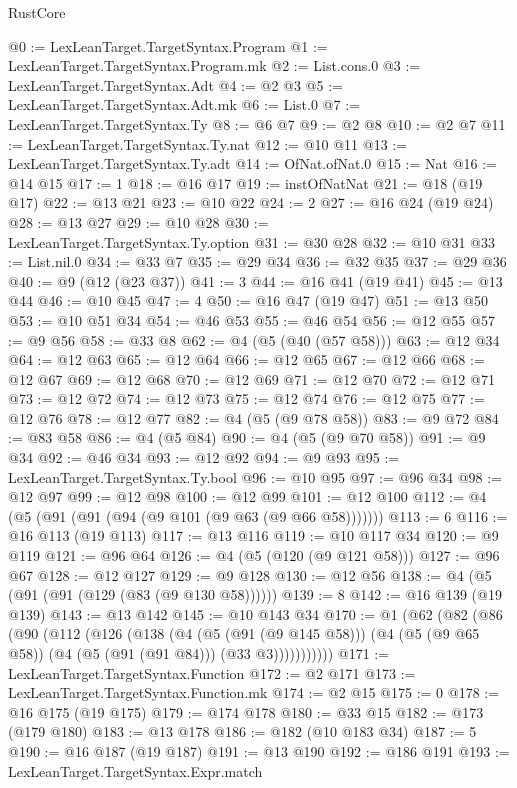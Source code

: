 \begin{lexlean}{RustCore}
\begin{coremodule}
@0 := LexLeanTarget.TargetSyntax.Program
@1 := LexLeanTarget.TargetSyntax.Program.mk
@2 := List.cons.{0}
@3 := LexLeanTarget.TargetSyntax.Adt
@4 := @2 @3
@5 := LexLeanTarget.TargetSyntax.Adt.mk
@6 := List.{0}
@7 := LexLeanTarget.TargetSyntax.Ty
@8 := @6 @7
@9 := @2 @8
@10 := @2 @7
@11 := LexLeanTarget.TargetSyntax.Ty.nat
@12 := @10 @11
@13 := LexLeanTarget.TargetSyntax.Ty.adt
@14 := OfNat.ofNat.{0}
@15 := Nat
@16 := @14 @15
@17 := 1
@18 := @16 @17
@19 := instOfNatNat
@21 := @18 (@19 @17)
@22 := @13 @21
@23 := @10 @22
@24 := 2
@27 := @16 @24 (@19 @24)
@28 := @13 @27
@29 := @10 @28
@30 := LexLeanTarget.TargetSyntax.Ty.option
@31 := @30 @28
@32 := @10 @31
@33 := List.nil.{0}
@34 := @33 @7
@35 := @29 @34
@36 := @32 @35
@37 := @29 @36
@40 := @9 (@12 (@23 @37))
@41 := 3
@44 := @16 @41 (@19 @41)
@45 := @13 @44
@46 := @10 @45
@47 := 4
@50 := @16 @47 (@19 @47)
@51 := @13 @50
@53 := @10 @51 @34
@54 := @46 @53
@55 := @46 @54
@56 := @12 @55
@57 := @9 @56
@58 := @33 @8
@62 := @4 (@5 (@40 (@57 @58)))
@63 := @12 @34
@64 := @12 @63
@65 := @12 @64
@66 := @12 @65
@67 := @12 @66
@68 := @12 @67
@69 := @12 @68
@70 := @12 @69
@71 := @12 @70
@72 := @12 @71
@73 := @12 @72
@74 := @12 @73
@75 := @12 @74
@76 := @12 @75
@77 := @12 @76
@78 := @12 @77
@82 := @4 (@5 (@9 @78 @58))
@83 := @9 @72
@84 := @83 @58
@86 := @4 (@5 @84)
@90 := @4 (@5 (@9 @70 @58))
@91 := @9 @34
@92 := @46 @34
@93 := @12 @92
@94 := @9 @93
@95 := LexLeanTarget.TargetSyntax.Ty.bool
@96 := @10 @95
@97 := @96 @34
@98 := @12 @97
@99 := @12 @98
@100 := @12 @99
@101 := @12 @100
@112 := @4 (@5 (@91 (@91 (@94 (@9 @101 (@9 @63 (@9 @66 @58)))))))
@113 := 6
@116 := @16 @113 (@19 @113)
@117 := @13 @116
@119 := @10 @117 @34
@120 := @9 @119
@121 := @96 @64
@126 := @4 (@5 (@120 (@9 @121 @58)))
@127 := @96 @67
@128 := @12 @127
@129 := @9 @128
@130 := @12 @56
@138 := @4 (@5 (@91 (@91 (@129 (@83 (@9 @130 @58))))))
@139 := 8
@142 := @16 @139 (@19 @139)
@143 := @13 @142
@145 := @10 @143 @34
@170 := @1
    (@62
      (@82
        (@86
          (@90
            (@112
              (@126
                (@138
                  (@4
                    (@5 (@91 (@9 @145 @58)))
                    (@4 (@5 (@9 @65 @58)) (@4 (@5 (@91 (@91 @84))) (@33 @3)))))))))))
@171 := LexLeanTarget.TargetSyntax.Function
@172 := @2 @171
@173 := LexLeanTarget.TargetSyntax.Function.mk
@174 := @2 @15
@175 := 0
@178 := @16 @175 (@19 @175)
@179 := @174 @178
@180 := @33 @15
@182 := @173 (@179 @180)
@183 := @13 @178
@186 := @182 (@10 @183 @34)
@187 := 5
@190 := @16 @187 (@19 @187)
@191 := @13 @190
@192 := @186 @191
@193 := LexLeanTarget.TargetSyntax.Expr.match

\end{coremodule}
\end{lexlean}
